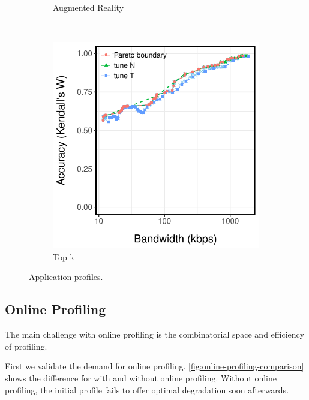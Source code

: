 \begin{figure}
\begin{subfigure}[t]{0.33\textwidth}
    \caption{Augmented Reality}
    \label{fig:ar-profile}
  \end{subfigure}
  ~
  \begin{subfigure}[t]{0.33\textwidth}
    \centering
    \includegraphics[width=\textwidth]{figures/topk-profile.pdf}
    \caption{Top-k}
    \label{fig:tk-profile}
  \end{subfigure}
  \caption{Application profiles.}
  \label{fig:all-profiles}
\end{figure}

\subsection{Online Profiling}
\label{sec:online-profiling}

The main challenge with online profiling is the combinatorial space and
efficiency of profiling.

First we validate the demand for online
profiling. \autoref{fig:online-profiling-comparison} shows the difference for
with and without online profiling. Without online profiling, the initial profile
fails to offer optimal degradation soon afterwards.

